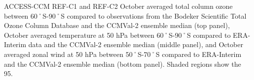 ACCESS-CCM REF-C1 and REF-C2 October averaged total column ozone between 60˚S-90˚S compared to observations from the Bodeker Scientific Total Ozone Column Database and the CCMVal-2 ensemble median (top panel), October averaged temperature at 50 hPa between 60˚S-90˚S compared to ERA-Interim data and the CCMVal-2 ensemble median (middle panel), and October averaged zonal wind at 50 hPa between 50˚S-70˚S compared to ERA-Interim and the CCMVal-2 ensemble median (bottom panel). Shaded regions show the 95.\\%
